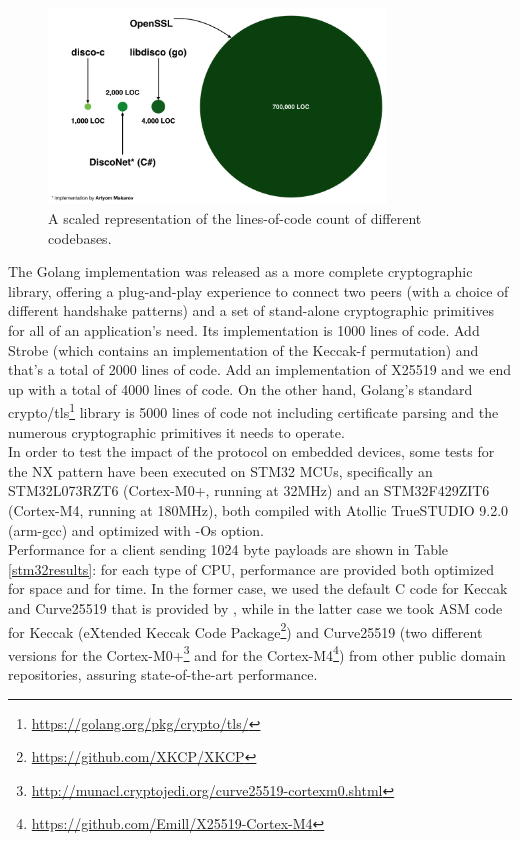 \documentclass{article}
\begin{document}
\begin{figure}[H]
\centering
\includegraphics[width=0.8\textwidth]{rwcimg/LOC.png}
\caption{A scaled representation of the lines-of-code count of different codebases.}
\label{fig:LOC}
\end{figure}

The Golang implementation was released as a more complete cryptographic library, offering a plug-and-play experience to connect two peers (with a choice of different handshake patterns) and a set of stand-alone cryptographic primitives for all of an application's need. Its implementation is 1000 lines of code. Add  Strobe (which contains an implementation of the Keccak-f permutation) and that's a total of 2000 lines of code. Add an implementation of X25519 and we end up with a total of 4000 lines of code. On the other hand, Golang's standard crypto/tls\footnote{\url{https://golang.org/pkg/crypto/tls/}} library is 5000 lines of code not including certificate parsing and the numerous cryptographic primitives it needs to operate.\\

In order to test the impact of the protocol on embedded devices, some tests for the NX pattern have been executed on STM32 MCUs, specifically an STM32L073RZT6 (Cortex-M0+, running at 32MHz) and an STM32F429ZIT6 (Cortex-M4, running at 180MHz), both compiled with Atollic TrueSTUDIO 9.2.0 (arm-gcc) and optimized with -Os option. \\

Performance for a client sending 1024 byte payloads are shown in Table \ref{stm32results}: for each type of CPU, performance are provided both optimized for space and for time. In the former case, we used the default C code for Keccak and Curve25519 that is provided by \cite{disco-c}, while in the latter case we took ASM code for Keccak (eXtended Keccak Code Package\footnote{\url{https://github.com/XKCP/XKCP}}) and Curve25519 (two different versions for the Cortex-M0+\footnote{\url{http://munacl.cryptojedi.org/curve25519-cortexm0.shtml}} and for the Cortex-M4\footnote{\url{https://github.com/Emill/X25519-Cortex-M4}}) from other public domain repositories, assuring state-of-the-art performance. 
\end{document}
